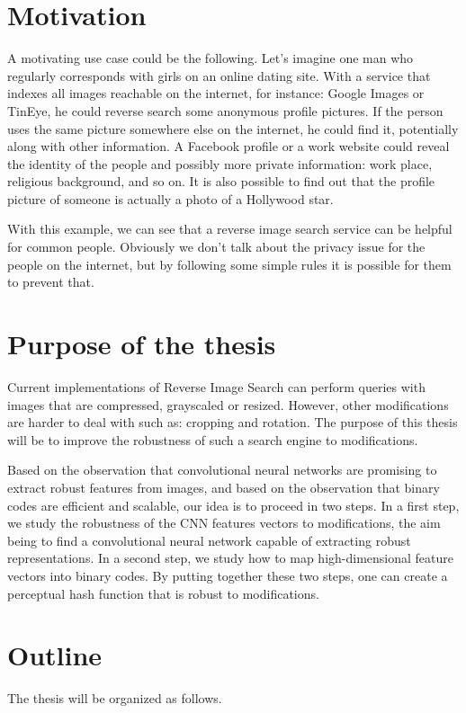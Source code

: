 \section{Motivation}
A motivating use case could be the following. Let's imagine one man who regularly corresponds with girls on an online dating site. With a service that indexes all images reachable on the internet, for instance: Google Images or TinEye, he could reverse search some anonymous profile pictures. If the person uses the same picture somewhere else on the internet, he could find it, potentially along with other information. A Facebook profile or a work website could reveal the identity of the people and possibly more private information: work place, religious background, and so on. It is also possible to find out that the profile picture of someone is actually a photo of a Hollywood star.

With this example, we can see that a reverse image search service can be helpful for common people. Obviously we don't talk about the privacy issue for the people on the internet, but by following some simple rules it is possible for them to prevent that.

\section{Purpose of the thesis}
Current implementations of Reverse Image Search can perform queries with images that are compressed, grayscaled or resized. However, other modifications are harder to deal with such as: cropping and rotation. The purpose of this thesis will be to improve the robustness of such a search engine to modifications.

Based on the observation that convolutional neural networks are promising to extract robust features from images, and based on the observation that binary codes are efficient and scalable, our idea is to proceed in two steps. In a first step, we study the robustness of the CNN features vectors to modifications, the aim being to find a convolutional neural network capable of extracting robust representations. In a second step, we study how to map high-dimensional feature vectors into binary codes. By putting together these two steps, one can create a perceptual hash function that is robust to modifications. 

\section{Outline}
The thesis will be organized as follows.

